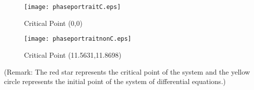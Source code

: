 \documentclass{article}
\begin{document}
\begin{minipage}{0.48\textwidth}
\begin{figure}[H]
\vspace{1mm}
	\centering
	\texttt{[image: phaseportraitC.eps]}
	\caption{Critical Point (0,0)}
	\label{fig:Critpt1}
	\vspace{0.4cm}
\end{figure}
\end{minipage}
\vline
\begin{minipage}{0.48\textwidth}
\vspace{1.5mm}
\begin{figure}[H]
	\centering
	\texttt{[image: phaseportraitnonC.eps]}
	\caption{Critical Point (11.5631,11.8698)}
	\label{fig:Critpt2}
	\vspace{0.4cm}
\end{figure}
\end{minipage}
\newline
\leavevmode
\newline
\newline
(Remark: The red star represents the critical point of the system and the yellow circle represents the initial point of the system of differential equations.)
\end{document}
